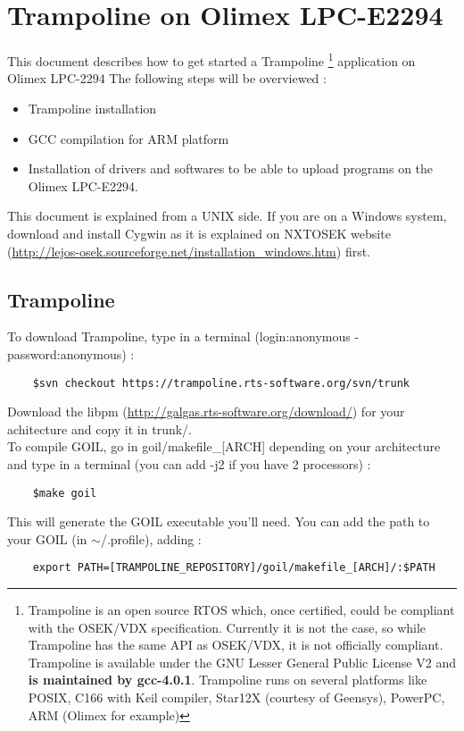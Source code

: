 
\chapter{Trampoline on Olimex LPC-E2294}

This document describes how to get started a Trampoline \footnote{Trampoline is an open source RTOS which, once certified, could be compliant with the OSEK/VDX specification. Currently it is not the case, so while Trampoline has the same API as OSEK/VDX, it is not officially compliant. Trampoline is available under the GNU Lesser General Public License V2 and \textbf{is maintained by gcc-4.0.1}. Trampoline runs on several platforms like POSIX, C166 with Keil compiler, Star12X (courtesy of Geensys), PowerPC, ARM (Olimex for example)} application on Olimex LPC-2294 %
The following steps will be overviewed :
\begin{itemize}
\item Trampoline installation
\item GCC compilation for ARM platform
\item Installation of drivers and softwares to be able to upload programs on the Olimex LPC-E2294.
\end{itemize}
This document is explained from a UNIX side. If you are on a Windows system, download and install Cygwin as it is explained on NXTOSEK website (\href{http://lejos-osek.sourceforge.net/installation_windows.htm}{http://lejos-osek.sourceforge.net/installation\_windows.htm}) first.

\section{Trampoline}
To download Trampoline, type in a terminal (login:anonymous - password:anonymous) :
	\begin{verbatim}
	$svn checkout https://trampoline.rts-software.org/svn/trunk
	\end{verbatim}
Download the libpm (\href{http://galgas.rts-software.org/download/}{http://galgas.rts-software.org/download/}) for your achitecture and copy it in trunk/.\\
To compile GOIL, go in goil/makefile\_[ARCH] depending on your architecture and type in a terminal (you can add -j2 if you have 2 processors) :
	\begin{verbatim}
	$make goil
	\end{verbatim}
This will generate the GOIL executable you'll need. You can add the path to your GOIL (in $\sim$/.profile), adding :
	\begin{verbatim}
	export PATH=[TRAMPOLINE_REPOSITORY]/goil/makefile_[ARCH]/:$PATH
	\end{verbatim}

